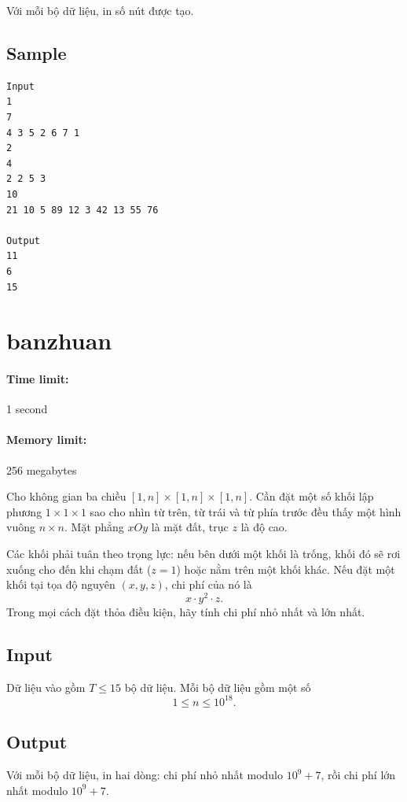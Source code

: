 \documentclass[11pt]{article}
\begin{document}
Với mỗi bộ dữ liệu, in số nút được tạo.

\subsection*{Sample}

\begin{verbatim}
Input
1
7
4 3 5 2 6 7 1
2
4
2 2 5 3
10
21 10 5 89 12 3 42 13 55 76

Output
11
6
15
\end{verbatim}

\section{banzhuan}

\paragraph{Time limit:} 1 second
\paragraph{Memory limit:} 256 megabytes

Cho không gian ba chiều \([1,n]\times[1,n]\times[1,n]\). Cần đặt một số khối
lập phương \(1\times1\times1\) sao cho nhìn từ trên, từ trái và từ phía trước
đều thấy một hình vuông \(n\times n\). Mặt phẳng \(xOy\) là mặt đất, trục
\(z\) là độ cao.

Các khối phải tuân theo trọng lực: nếu bên dưới một khối là trống, khối đó sẽ
rơi xuống cho đến khi chạm đất (\(z=1\)) hoặc nằm trên một khối khác. Nếu đặt
một khối tại tọa độ nguyên \((x,y,z)\), chi phí của nó là
\[
  x\cdot y^2\cdot z.
\]
Trong mọi cách đặt thỏa điều kiện, hãy tính chi phí nhỏ nhất và lớn nhất.

\subsection*{Input}

Dữ liệu vào gồm \(T\le 15\) bộ dữ liệu. Mỗi bộ dữ liệu gồm một số
\[
  1\le n\le 10^{18}.
\]

\subsection*{Output}

Với mỗi bộ dữ liệu, in hai dòng: chi phí nhỏ nhất modulo \(10^9+7\), rồi chi
phí lớn nhất modulo \(10^9+7\).
\end{document}
